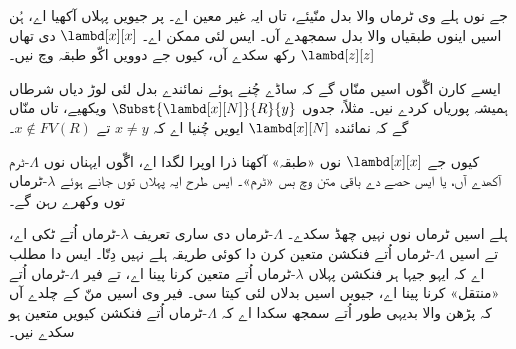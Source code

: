 \documentclass[../../../include/open-logic-section]{subfiles}
\begin{document}
جے  نوں ہلے وی ٹرماں والا بدل منّیئے، تاں ایہ
غیر معین اے۔ پر جیویں پہلاں آکھیا اے، ہُن اسیں اینوں طبقیاں
والا بدل سمجھدے آں۔ ایس لئی  ممکن اے۔
$\lambd[x][x]$ دی تھاں $\lambd[z][z]$ رکھ سکدے آں، کیوں جے
دوویں اکّو طبقہ وچ نیں۔

ایسے کارن اگّوں اسیں منّاں گے کہ ساڈے چُنے ہوئے نمائندے بدل
لئی لوڑ دیاں شرطاں ہمیشہ پوریاں کردے نیں۔ مثلاً، جدوں
$\Subst{\lambd[x][N]}{R}{y}$ ویکھیے، تاں منّاں گے کہ نمائندہ
$\lambd[x][N]$ ایویں چُنیا اے کہ $x \neq y$ تے $x \notin FV(R)$۔

کیوں جے $\lambd[x][x]$ نوں «طبقہ» آکھنا ذرا اوپرا لگدا اے،
اگّوں ایہناں نوں $\Lambda$-ٹرم آکھدے آں، یا ایس حصے دے باقی
متن وچ بس «ٹرم»۔ ایس طرح ایہ پہلاں توں جانے ہوئے $\lambda$-ٹرماں
توں وکھرے رہن گے۔

\begin{editorial}
  ہلے اسیں ٹرماں نوں نہیں چھڈ سکدے۔ $\Lambda$-ٹرماں دی ساری
  تعریف $\lambda$-ٹرماں اُتے ٹکی اے، تے اسیں $\Lambda$-ٹرماں
  اُتے فنکشن متعین کرن دا کوئی طریقہ ہلے نہیں دِتّا۔ ایس دا
  مطلب اے کہ ایہو جیہا ہر فنکشن پہلاں $\lambda$-ٹرماں اُتے
  متعین کرنا پینا اے، تے فیر $\Lambda$-ٹرماں اُتے «منتقل» کرنا
  پینا اے، جیویں اسیں بدلاں لئی کیتا سی۔ فیر وی اسیں منّ کے
  چلدے آں کہ پڑھن والا بدیہی طور اُتے سمجھ سکدا اے کہ
  $\Lambda$-ٹرماں اُتے فنکشن کیویں متعین ہو سکدے نیں۔
\end{editorial}
\end{document}
